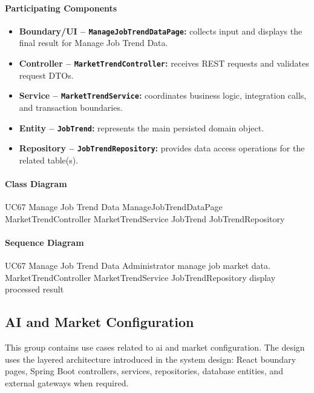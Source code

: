 \paragraph{Participating Components}

\begin{itemize}
    \item \textbf{Boundary/UI -- \texttt{ManageJobTrendDataPage}:} collects input and displays the final result for Manage Job Trend Data.
    \item \textbf{Controller -- \texttt{MarketTrendController}:} receives REST requests and validates request DTOs.
    \item \textbf{Service -- \texttt{MarketTrendService}:} coordinates business logic, integration calls, and transaction boundaries.
    \item \textbf{Entity -- \texttt{JobTrend}:} represents the main persisted domain object.
    \item \textbf{Repository -- \texttt{JobTrendRepository}:} provides data access operations for the related table(s).
\end{itemize}

\paragraph{Class Diagram}

\ClassDiagram
{UC67 Manage Job Trend Data}
{ManageJobTrendDataPage}
{MarketTrendController}
{MarketTrendService}
{JobTrend}
{JobTrendRepository}

\paragraph{Sequence Diagram}

\SequenceDiagram
{UC67 Manage Job Trend Data}
{Administrator}
{manage job market data.}
{MarketTrendController}
{MarketTrendService}
{JobTrendRepository}
{display processed result}

\subsection{AI and Market Configuration}

This group contains use cases related to ai and market configuration. The design uses the layered architecture introduced in the system design: React boundary pages, Spring Boot controllers, services, repositories, database entities, and external gateways when required.

